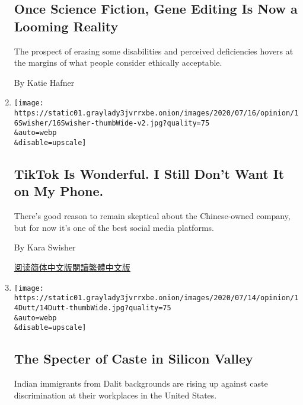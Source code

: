 \begin{enumerate}
{  \subsection{Once Science Fiction, Gene Editing Is Now a Looming
  Reality}\label{once-science-fiction-gene-editing-is-now-a-looming-reality}}

  The prospect of erasing some disabilities and perceived deficiencies
  hovers at the margins of what people consider ethically acceptable.

  By Katie Hafner
\item
  \href{/2020/07/17/opinion/tiktok-ban-china.html}{}

  \texttt{[image: https://static01.graylady3jvrrxbe.onion/images/2020/07/16/opinion/16Swisher/16Swisher-thumbWide-v2.jpg?quality=75\\\&auto=webp\\\&disable=upscale]}

  \hypertarget{tiktok-is-wonderful-i-still-dont-want-it-on-my-phone}{%
  \subsection{TikTok Is Wonderful. I Still Don't Want It on My
  Phone.}\label{tiktok-is-wonderful-i-still-dont-want-it-on-my-phone}}

  There's good reason to remain skeptical about the Chinese-owned
  company, but for now it's one of the best social media platforms.

  By Kara Swisher

  \href{https://cn.nytimes3xbfgragh.onion/opinion/20200720/tiktok-ban-china/}{阅读简体中文版}\href{https://cn.nytimes3xbfgragh.onion/opinion/20200720/tiktok-ban-china/zh-hant/}{閱讀繁體中文版}
\item
  \href{/2020/07/14/opinion/caste-cisco-indian-americans-discrimination.html}{}

  \texttt{[image: https://static01.graylady3jvrrxbe.onion/images/2020/07/14/opinion/14Dutt/14Dutt-thumbWide.jpg?quality=75\\\&auto=webp\\\&disable=upscale]}

  \hypertarget{the-specter-of-caste-in-silicon-valley}{%
  \subsection{The Specter of Caste in Silicon
  Valley}\label{the-specter-of-caste-in-silicon-valley}}

  Indian immigrants from Dalit backgrounds are rising up against caste
  discrimination at their workplaces in the United States.


\end{enumerate}
